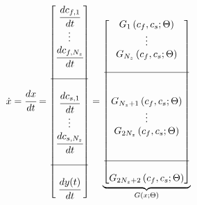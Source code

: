 \documentclass[../Article_Model_Parameters.tex]{subfiles}
\begin{document}

		
		{\footnotesize
			\begin{align*} \label{discretization}
				\dot{x} &= \cfrac{d x}{d t} = 
				\begin{bmatrix}
					\cfrac{d c_{f,1}}{d t} 	  \\
					\vdots		\\	
					\cfrac{d c_{f,N_z}}{d t} \\
					\\ \hline  	\\
					\cfrac{d c_{s,1}}{d t} 	  \\
					\vdots		\\
					\cfrac{d c_{s,N_z}}{d t} \\
					\\ \hline \\
					\cfrac{d {\color{black}y}(t)}{d t}
				\end{bmatrix}
				=
				\underbrace{\begin{bmatrix}
						G_1 \left( c_f,c_s; \Theta \right)\\ 
						\vdots\\ 
						G_{N_z} \left( c_f,c_s; \Theta \right)\\ 
						\\ \hline \\ \\
						G_{N_z+1} \left( c_f,c_s; \Theta \right)\\ 
						\vdots\\
						G_{2N_z} \left( c_f,c_s; \Theta \right)\\ 
						\\ \\ \hline \\
						G_{2N_z+2} \left( c_f,c_s; \Theta \right) 
				\end{bmatrix}}_{G \left( x; \Theta \right)} 
		\end{align*} }
		
\end{document}
